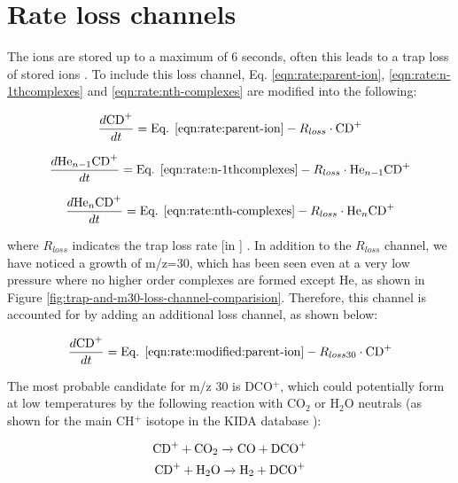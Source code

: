 \section{Rate loss channels}
\label{subsec:rate-loss-channels}

The ions are stored up to a maximum of 6 seconds, often this leads to a trap loss of stored ions \cite{mikosch_evaporation_2007, mikosch_evaporation_2008}. To include this loss channel, Eq. \ref{eqn:rate:parent-ion}, \ref{eqn:rate:n-1thcomplexes} and \ref{eqn:rate:nth-complexes} are modified into the following:

\begin{equation}
    \frac{d\text{CD}^+}{dt} = \text{Eq. } \ref{eqn:rate:parent-ion} - R_{loss} \cdot \text{CD}^+
    \label{eqn:rate:modified:parent-ion}
\end{equation}

\begin{equation}
    \frac{d\text{He}_{n-1}\text{CD}^+}{dt} = \text{Eq. } \ref{eqn:rate:n-1thcomplexes} - R_{loss} \cdot \text{He}_{n-1}\text{CD}^+
    \label{eqn:rate:modified:n-1complexes}
\end{equation}

\begin{equation}
    \frac{d\text{He}_{n}\text{CD}^+}{dt} = \text{Eq. } \ref{eqn:rate:nth-complexes} - R_{loss} \cdot \text{He}_{n}\text{CD}^+
    \label{eqn:rate:modified:nth-complexes}
\end{equation}

where $R_{loss}$ indicates the trap loss rate [in \pers] . In addition to the
$R_{loss}$ channel, we have noticed a growth of m/z=30, which has been seen
even at a very low pressure where no higher order complexes are formed except He\CD, as
shown in Figure \ref{fig:trap-and-m30-loss-channel-comparision}. Therefore,
this channel is accounted for by adding an additional loss channel, as shown
below:

\begin{equation}
    \frac{d\text{CD}^+}{dt} = \text{Eq. } \ref{eqn:rate:modified:parent-ion} - R_{loss30} \cdot \text{CD}^+
    \label{eqn:rate:parent-ion-mass30-loss}
\end{equation}

The most probable candidate for m/z 30 is DCO$^+$, which could potentially form
at low temperatures by the following reaction with CO$_2$ or H$_2$O neutrals
(as shown for the main CH$^+$ isotope in the KIDA database \cite{wakelam_2014_2015}):

\begin{equation}
    \text{CD}^+ + \text{CO}_2 \xrightarrow{} \text{CO} + \text{DCO}^+
    \label{eqn:mass-30-reaction-with-CO2}
\end{equation}
\begin{equation}
    \text{CD}^+ + \text{H$_2$O} \xrightarrow{} \text{H$_2$} + \text{DCO}^+
    \label{eqn:mass-30-reaction-with-water}
\end{equation}

